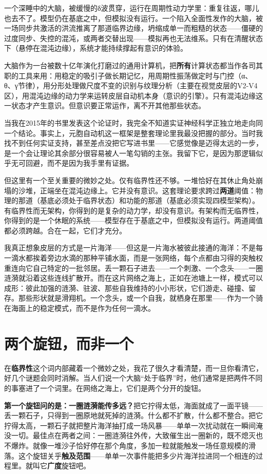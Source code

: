 \documentclass[11pt, twoside, openright]{book}
\begin{document}
一个深睡中的大脑，被缓慢的δ波贯穿，运行在周期性动力学里：重复往返，哪儿也去不了。模型仍在基底之中，但模拟没有运行。一个陷入全面性发作的大脑，被一场同步共激活的洪流推离了那道临界边缘，坍缩成单一而粗糙的状态------僵硬的过度同步、失控的混沌，或两者交替出现------模拟再也无法维系。只有在清醒状态下（悬停在混沌边缘），系统才能持续撑起有意识的体验。

大脑作为一台被数十亿年演化打磨过的通用计算机，把\textbf{所有}计算状态都当作各司其职的工具来用：用稳定的吸引子做长期记忆，用周期性振荡做定时与门控（α、θ、γ节律），用分形处理做尺度不变的识别与纹理分析（主要在视觉皮层的V2-V4区），用混沌边缘的动力学来运转皮层自动机本身（意识的引擎）。只有混沌边缘这一状态才产生意识。但意识要正常运作，离不开其他那些状态。

当我在2015年的书里发表这个论证时，我完全不知道实证神经科学正独立地走向同一个结论。事实上，元胞自动机这一框架是整套理论里我最没把握的部分。当时我找不到任何实证支持，甚至差点没把它写进书里------它感觉像是迈得太远的一步，是一个会让理论其余部分很容易被人一笔勾销的主张。我留下它，是因为那逻辑似乎无可回避，而不是因为我手里有证据。

但这里有一个至关重要的微妙之处。仅有临界性还不够。一堆恰好在其休止角处崩塌的沙堆，正端坐在混沌边缘上。它并没有意识。这套理论要求跨过\textbf{两道}阈值：物理的那道（基底必须处于临界状态）和功能的那道（基底必须实现四模型架构）。有临界性而无架构，你得到的是复杂的动力学，却没有意识。有架构而无临界性，你得到的是一个休眠的系统------模型存在于基底之中，但模拟没有运行。两道阈值都必须跨越。合在一起，它们才充分。

我真正想象皮层的方式是一片海洋------但这是一片海水被彼此接通的海洋：不是每一滴水都挨着旁边水滴的那种平铺水面，而是一张网络，每个点都由习得的突触权重连向它自己特定的一批邻居。丢一颗石子进去------一个刺激、一个念头------一圈涟漪就沿着这些连线扩散开。而在这片网络之海上，正如在池塘上一样，模式可以成形：彼此加强的涟漪、驻波、那些自我维持的小小形状，它们游走、碰撞、留存。那些形状就是滑翔机。一个念头，或一个自我，就栖身在那里------作为一个骑在海面上的稳定模式，而不是作为任何一滴水。

\section*{两个旋钮，而非一个}

在\textbf{临界性}这个词内部藏着一个微妙之处，我花了很久才看清楚，而一旦你看清它，好几个谜题会同时消解。当人们说一个大脑“处于临界”时，他们通常是把两件不同的事塞进了一个词里。在网络之海上，它们是两个分开的旋钮。

\textbf{第一个旋钮问的是：一圈涟漪能传多远？}把它拧得太低，海面就成了一面平镜------丢一颗石子，只得到一圈原地就死掉的涟漪。什么都不扩散，什么都不整合。把它拧得太高，一颗石子就把整片海洋抽打成一场风暴------单单一次扰动就在一瞬间淹没一切。最佳点在两者之间：一圈涟漪往外传，大致催生出一圈新的，既不熄灭也不爆炸。就像一堆沙子恰好停在那个角度，多加一粒就能触发一场任意规模的滑落。这个旋钮关乎\textbf{触及范围}------单单一次事件能把多少片海洋拉进同一个相连的过程里。就叫它\textbf{广度}旋钮吧。
\end{document}
